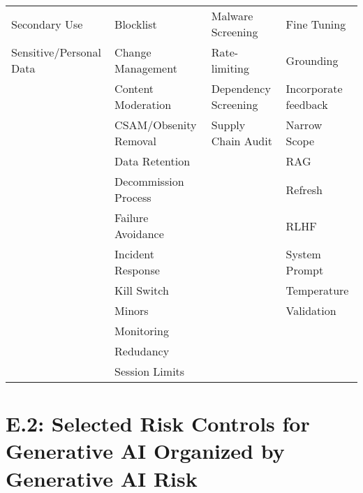 \documentclass[fleqn]{article}
\begin{document}
\begin{table}[H]
\begin{tabular}{llll}
		Secondary Use & Blocklist  & Malware Screening & Fine Tuning \\
		Sensitive/Personal Data  & Change Management & Rate-limiting  & Grounding \\
		& Content Moderation & Dependency Screening  & Incorporate feedback  \\
		& CSAM/Obsenity Removal  & Supply Chain Audit & Narrow Scope \\
		& Data Retention &  & RAG \\
		& Decommission Process &  & Refresh \\
		& Failure Avoidance &  & RLHF \\
		& Incident Response &  & System Prompt  \\
		& Kill Switch &  & Temperature \\
		& Minors &  & Validation \\
		& Monitoring &  &  \\
		& Redudancy &  &  \\
		& Session Limits &  &  \\
		\bottomrule
	\end{tabular}
\end{table}		
		
\section*{E.2: Selected Risk Controls for Generative AI Organized by Generative AI Risk}\label{sec:appndxe2}
\end{document}
